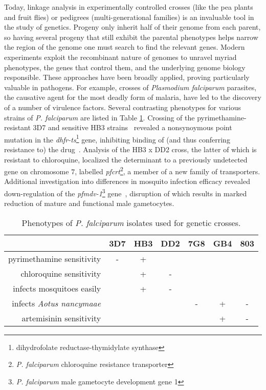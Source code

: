 Today, linkage analysis in experimentally controlled crosses (like the pea plants and fruit flies) or pedigrees (multi-generational families) is an invaluable tool in the study of genetics.  Progeny only inherit half of their genome from each parent, so having several progeny that still exhibit the parental phenotypes helps narrow the region of the genome one must search to find the relevant genes.  Modern experiments exploit the recombinant nature of genomes to unravel myriad phenotypes, the genes that control them, and the underlying genome biology responsible.  These approaches have been broadly applied, proving particularly valuable in pathogens.  For example, crosses of \textit{Plasmodium falciparum} parasites, the causative agent for the most deadly form of malaria, have led to the discovery of a number of virulence factors.  Several contrasting phenotypes for various strains of \textit{P. falciparum} are listed in Table \ref{tb:pf_phenotypes}.  Crossing of the pyrimethamine-resistant 3D7 and sensitive HB3 strains~\cite{Walliker:1987cv} revealed a nonsynoymous point mutation in the \textit{dhfr-ts}\footnote{dihydrofolate reductase-thymidylate synthase} gene, inhibiting binding of (and thus conferring resistance to) the drug~\cite{Peterson:1988wt}.  Analysis of the HB3 x DD2 cross\cite{Wellems:1990eg}, the latter of which is resistant to chloroquine, localized the determinant to a previously undetected gene on chromosome $7$, labelled \textit{pfcrt}\footnote{\textit{P. falciparum} chloroquine resistance transporter}, a member of a new family of transporters.  Additional investigation into differences in mosquito infection efficacy revealed down-regulation of the \textit{pfmdv-1}\footnote{\textit{P. falciparum} male gametocyte development gene 1} gene~\cite{Vaidya:1995up,Furuya:2005jn}, disruption of which results in marked reduction of mature and functional male gametocytes.

\begin{table}[]
\centering
\caption{Phenotypes of \textit{P. falciparum} isolates used for genetic crosses.}
\label{tb:pf_phenotypes}
\begin{tabular}{@{}rcccccc@{}}
\toprule
                                 & 3D7 & HB3 & DD2 & 7G8 & GB4 & 803 \\
\midrule
pyrimethamine sensitivity        & -   & +   &     &     &     &     \\
chloroquine sensitivity          &     & +   & -   &     &     &     \\
infects mosquitoes easily        &     & +   & -   &     &     &     \\
infects \textit{Aotus nancymaae} &     &     &     & -   & +   & -   \\
artemisinin sensitivity          &     &     &     &     & +   & -   \\
\bottomrule
\end{tabular}
\end{table}

